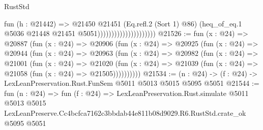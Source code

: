 \begin{lexlean}{RustStd}
\begin{coremodule}
                                          fun (h : @21442) =>
                                          @21450
                                            @21451
                                            (Eq.refl.{2} (Sort 1) @86)
                                            (heq_of_eq.{1}
                                              @5036
                                              @21448
                                              @21451
                                              @5051)))))))))))))))))))))
@21526 := fun (x : @24) =>
  @20887
    (fun (x : @24) =>
    @20906
      (fun (x : @24) =>
      @20925
        (fun (x : @24) =>
        @20944
          (fun (x : @24) =>
          @20963
            (fun (x : @24) =>
            @20982
              (fun (x : @24) =>
              @21001
                (fun (x : @24) =>
                @21020
                  (fun (x : @24) =>
                  @21039 (fun (x : @24) => @21058 (fun (x : @24) => @21505))))))))))
@21534 := (n : @24) -> (f : @24) -> LexLeanPreservation.Rust.FunSem @5011 @5013 @5015 @5095 @5051
@21544 := fun (n : @24) =>
  fun (f : @24) =>
  LexLeanPreservation.Rust.simulate
    @5011
    @5013
    @5015
    LexLeanPreserve.Cc4bcfca7162c3bbdab44e811b08d9029.R6.RustStd.crate_ok
    @5095
    @5051
\end{coremodule}
\end{lexlean}
